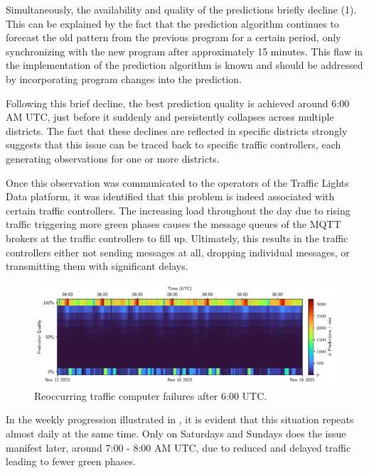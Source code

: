 Simultaneously, the availability and quality of the predictions briefly decline (1). This can be explained by the fact that the prediction algorithm continues to forecast the old pattern from the previous program for a certain period, only synchronizing with the new program after approximately 15 minutes. This flaw in the implementation of the prediction algorithm is known and should be addressed by incorporating program changes into the prediction.

Following this brief decline, the best prediction quality is achieved around 6:00 AM UTC, just before it suddenly and persistently collapses across multiple districts. The fact that these declines are reflected in specific districts strongly suggests that this issue can be traced back to specific traffic controllers, each generating observations for one or more districts. 

Once this observation was communicated to the operators of the Traffic Lights Data platform, it was identified that this problem is indeed associated with certain traffic controllers. The increasing load throughout the day due to rising traffic triggering more green phases causes the message queues of the MQTT brokers at the traffic controllers to fill up. Ultimately, this results in the traffic controllers either not sending messages at all, dropping individual messages, or transmitting them with significant delays.

\begin{figure}[t]
    \centering
    \includegraphics[width=\linewidth]{images/monitoring-7-days.pdf}
    \caption{Reoccurring traffic computer failures after 6:00 UTC.}\label{fig:monitoring-7-days}
\end{figure}

In the weekly progression illustrated in , it is evident that this situation repeats almost daily at the same time. Only on Saturdays and Sundays does the issue manifest later, around 7:00 - 8:00 AM UTC, due to reduced and delayed traffic leading to fewer green phases.


